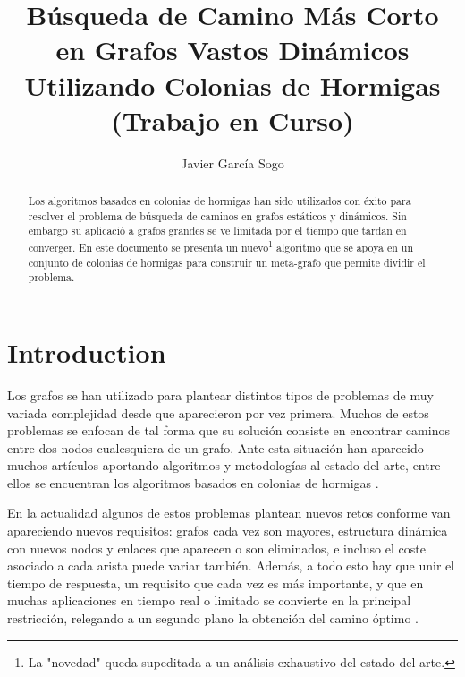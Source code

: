 \documentclass{llncs}
\begin{document}
%
\mainmatter              %
%
\title{B{\'u}squeda de Camino M{\'a}s Corto en Grafos Vastos Din{\'a}micos Utilizando Colonias de Hormigas (Trabajo en Curso)}
%
%
\author{Javier Garc{\'i}a Sogo}
%
%
%

\maketitle              %

\begin{abstract}
Los algoritmos basados en colonias de hormigas han sido utilizados con éxito para resolver el problema de b{\'u}squeda de caminos en grafos est{\'a}ticos y din{\'a}micos. Sin embargo su aplicaci{\'o} a grafos grandes se ve limitada por el tiempo que tardan en converger.
En este documento se presenta un nuevo\footnote{La "novedad" queda supeditada a un an{\'a}lisis exhaustivo del estado del arte.} algoritmo que se apoya en un conjunto de colonias de hormigas para construir un meta-grafo que permite dividir el problema.
\end{abstract}
%
\section{Introduction}
%
Los grafos se han utilizado para plantear distintos tipos de problemas de muy variada complejidad desde que aparecieron por vez primera.
Muchos de estos problemas se enfocan de tal forma que su soluci{\'o}n consiste en encontrar caminos entre dos nodos cualesquiera de un grafo. 
Ante esta situaci{\'o}n han aparecido muchos art{\'i}culos aportando algoritmos y metodolog{\'i}as al estado del arte, entre ellos se encuentran los algoritmos basados en colonias de hormigas \cite{Dorigo1992}.

En la actualidad algunos de estos problemas plantean nuevos retos conforme van apareciendo nuevos requisitos: grafos cada vez son mayores, estructura din{\'a}mica con nuevos nodos y enlaces que aparecen o son eliminados, e incluso el coste asociado a cada arista puede variar tambi{\'e}n.
Adem{\'a}s, a todo esto hay que unir el tiempo de respuesta, un requisito que cada vez es m{\'a}s importante, y que en muchas aplicaciones en tiempo real o limitado se convierte en la principal restricci{\'o}n, relegando a un segundo plano la obtenci{\'o}n del camino {\'o}ptimo \cite{Rivero2011}.
\end{document}
